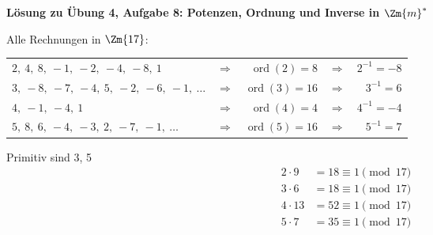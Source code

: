 \textbf{Lösung zu Übung 4, Aufgabe 8: Potenzen, Ordnung und Inverse in $\Zm{m}^*$}

\begin{loesung}
Alle Rechnungen in $\Zm{17}$:

\begin{tabular}{lcrcr}
$2,\ 4,\ 8,\ -1,\ -2,\ -4,\ -8,\ 1$ & $\Rightarrow$ & $\operatorname{ord}(2) = 8$ & $\Rightarrow$ & $2^{-1} = -8$\\
$3,\ -8,\ -7,\ -4,\ 5,\ -2,\ -6,\ -1,\ \ldots$ & $\Rightarrow$ & $\operatorname{ord}(3) = 16$ & $\Rightarrow$ & $3^{-1} = 6$\\
$4,\ -1,\ -4,\ 1$ & $\Rightarrow$ & $\operatorname{ord}(4) = 4$ & $\Rightarrow$ & $4^{-1} = -4$\\
$5,\ 8,\ 6,\ -4,\ -3,\ 2,\ -7,\ -1,\ \ldots$ & $\Rightarrow$ & $\operatorname{ord}(5) = 16$ & $\Rightarrow$ & $5^{-1} = 7$
\end{tabular}

\medskip
Primitiv sind 3, 5
\begin{align*}
2 \cdot 9 &= 18 \equiv 1 \pmod{17}\\
3 \cdot 6 &= 18 \equiv 1 \pmod{17}\\
4 \cdot 13 &= 52 \equiv 1 \pmod{17}\\
5 \cdot 7 &= 35 \equiv 1 \pmod{17}
\end{align*}
\end{loesung}
